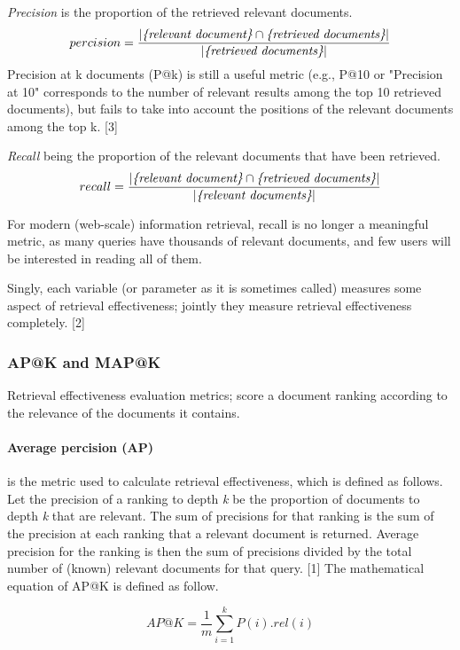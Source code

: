 \emph{Precision} is the proportion of the retrieved relevant documents.
\begin{equation}
	percision = \frac{|\emph{\{relevant document\}} \cap \emph{\{retrieved documents\}}|}{|\emph{\{retrieved documents\}}|}
	\label{eq:percision}
\end{equation}
Precision at k documents (P@k) is still a useful metric (e.g., P@10 or "Precision at 10" corresponds to the number of relevant results among the top 10 retrieved documents), 
but fails to take into account the positions of the relevant documents among the top k. [3]

\emph{Recall} being the proportion of the relevant documents that have been retrieved.
\begin{equation}
	recall = \frac{|\emph{\{relevant document\}} \cap \emph{\{retrieved documents\}}|}{|\emph{\{relevant documents\}}|}
	\label{eq:recall}
\end{equation}

For modern (web-scale) information retrieval, recall is no longer a meaningful metric, as many queries have thousands of relevant documents, and few users will be interested in reading all of them.

Singly, each variable (or parameter as it is sometimes called) measures some aspect of retrieval effectiveness; jointly they measure retrieval effectiveness completely. [2]

\subsubsection{AP@K and MAP@K}
\label{AP@K and MAP@K}
Retrieval effectiveness evaluation metrics; score a document ranking according to the relevance of the documents it contains. 
\paragraph*{Average percision (AP)} is the metric used to calculate retrieval effectiveness, which is defined as follows. 
Let the precision of a ranking to depth \emph{k} be
the proportion of documents to depth \emph{k} that are relevant. The sum of precisions for that
ranking is the sum of the precision at each ranking that a relevant document is returned.
Average precision for the ranking is then the sum of precisions divided by the total number of (known) relevant documents for that query. [1] 
The mathematical equation of AP@K is defined as follow.

\begin{equation}
	AP@K = \frac{1}{m}\sum_{i=1}^{k}P(i).rel(i)
	\label{eq:ap@k}
\end{equation}

